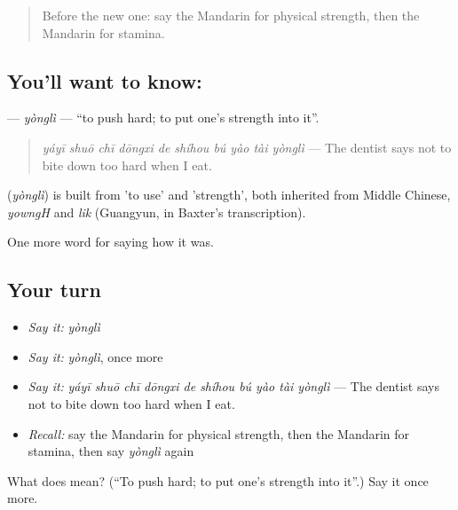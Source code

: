 \label{lesson:ZH-C474-yongli}



\begin{quote}
Before the new one: say the Mandarin for physical strength, then the Mandarin for stamina.
\end{quote}

\subsection*{You'll want to know: }
\textbf{} — \emph{yònglì} — \textquotedblleft{}to push hard; to put one's strength into it\textquotedblright{}.

\begin{quote}
\textbf{} \emph{yáyī shuō chī dōngxi de shíhou bú yào tài yònglì} — The dentist says not to bite down too hard when I eat.
\end{quote}

\begin{cousinweb}
\textbf{} (\emph{yònglì}) is built from  'to use' and  'strength', both inherited from Middle Chinese, \emph{yowngH} and \emph{lik} (Guangyun, in Baxter's transcription).
\end{cousinweb}

\begin{grammarlens}[title={What you've built}]
One more word for saying how it was.
\end{grammarlens}

\subsection*{Your turn}
\begin{itemize}
\raggedright
  \item \emph{Say it:} \emph{yònglì}
  \item \emph{Say it:} \emph{yònglì}, once more
  \item \emph{Say it:} \emph{yáyī shuō chī dōngxi de shíhou bú yào tài yònglì} — The dentist says not to bite down too hard when I eat.
  \item \emph{Recall:} say the Mandarin for physical strength, then the Mandarin for stamina, then say \emph{yònglì} again
\end{itemize}

\begin{tcolorbox}[breakable,colback=teal!4,colframe=teal!35!black,title={Before you move on}]
What does  mean? (\textquotedblleft{}To push hard; to put one's strength into it\textquotedblright{}.) Say it once more.
\end{tcolorbox}

